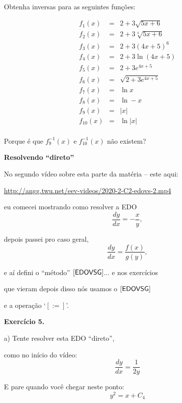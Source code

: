 \documentclass[oneside,12pt]{article}
\begin{document}
Obtenha inversas para as seguintes funções:

%
$$\begin{array}{rcl}
  f_1(x) &=& 2 + 3 \sqrt   {5x+6} \\
  f_2(x) &=& 2 + 3 \sqrt[4]{5x+6} \\
  f_3(x) &=& 2 + 3 (4x+5)^6 \\
  f_4(x) &=& 2 + 3 \ln(4x + 5) \\
  f_5(x) &=& 2 + 3 e^{4x + 5} \\
  f_6(x) &=& \sqrt{2 + 3 e^{4x + 5}} \\[10pt]
  f_7(x) &=& \ln x \\
  f_8(x) &=& \ln -x\\
  f_9(x) &=& |x|\\
  f_{10}(x) &=& \ln |x|\\
  \end{array}
$$

\msk

Porque é que $f_9^{-1}(x)$ e $f_{10}^{-1}(x)$ não existem?


\newpage


{\bf Resolvendo ``direto''}

No segundo vídeo sobre esta parte da matéria -- este aqui:

\ssk

{\footnotesize

\url{http://angg.twu.net/eev-videos/2020-2-C2-edovs-2.mp4}

}

\ssk

eu comecei mostrando como resolver a EDO $$\frac{dy}{dx} = - \frac xy,$$

depois passei pro caso geral, $$\frac{dy}{dx} = \frac{f(x)}{g(y)},$$

e aí defini o ``método'' $\mathsf{[EDOVSG]}$... e nos exercícios

que vieram depois disso nós usamos o $\mathsf{[EDOVSG]}$

e a operação `$[:=]$'.


\newpage


{\bf Exercício 5.}

a) Tente resolver esta EDO ``direto'',

como no início do vídeo:
%
$$\frac{dy}{dx} = \frac{1}{2y}$$

E pare quando você chegar neste ponto:
%
$$y^2 = x + C_4$$
\end{document}
